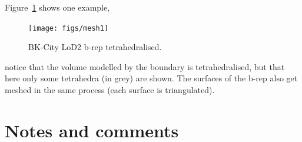 Figure~\ref{fig:meshing} shows one example,
\begin{figure}
  \centering
  \texttt{[image: figs/mesh1]}
  \caption{BK-City LoD2 b-rep tetrahedralised.}%
\label{fig:meshing}
\end{figure}
notice that the volume modelled by the boundary is tetrahedralised, but that here only some tetrahedra (in grey) are shown. 
The surfaces of the b-rep also get meshed in the same process (each surface is triangulated).







%
\section{Notes and comments}

